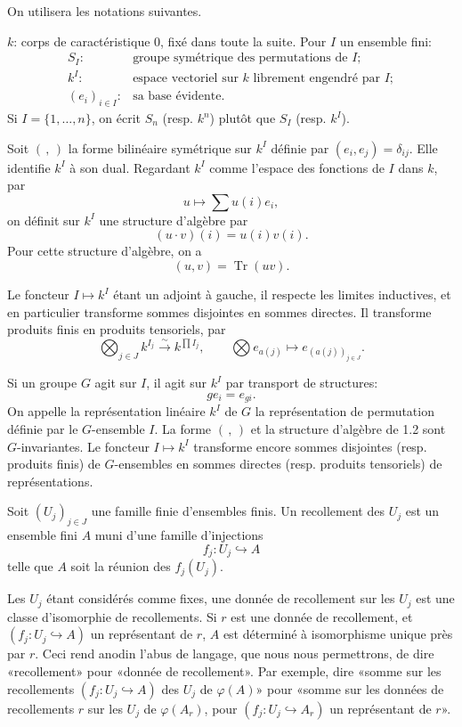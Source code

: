 \documentclass[11pt]{article}
\newcommand{\Tr}{\operatorname{Tr}}
\theoremstyle{deligne}
\newcommand{\para}[1]{\vspace{0.65em}\noindent{\bfseries #1}\quad}
\begin{document}
\para{1.1.}
On utilisera les notations suivantes.

\(k\): corps de caractéristique \(0\), fixé dans toute la suite. Pour \(I\) un ensemble fini:
\[
\begin{array}{rl}
S_I:&\text{groupe symétrique des permutations de }I;\\
k^I:&\text{espace vectoriel sur \(k\) librement engendré par }I;\\
(e_i)_{i\in I}:&\text{sa base évidente.}
\end{array}
\]
Si \(I=\{1,\ldots,n\}\), on écrit \(S_n\) (resp. \(k^n\)) plutôt que \(S_I\) (resp. \(k^I\)).

\para{1.2.}
Soit \((\, ,\, )\) la forme bilinéaire symétrique sur \(k^I\) définie par \((e_i,e_j)=\delta_{ij}\). Elle identifie \(k^I\) à son dual. Regardant \(k^I\) comme l'espace des fonctions de \(I\) dans \(k\), par
\[
  u\longmapsto \sum u(i)e_i,
\]
on définit sur \(k^I\) une structure d'algèbre par
\[
  (u\cdot v)(i)=u(i)v(i).
\]
Pour cette structure d'algèbre, on a
\[
  (u,v)=\Tr(uv).
\]

\para{1.3.}
Le foncteur \(I\mapsto k^I\) étant un adjoint à gauche, il respecte les limites inductives, et en particulier transforme sommes disjointes en sommes directes. Il transforme produits finis en produits tensoriels, par
\[
  \bigotimes_{j\in J} k^{I_j}\overset{\sim}{\longrightarrow}
  k^{\prod I_j},\qquad
  \bigotimes e_{a(j)}\longmapsto e_{(a(j))_{j\in J}}.
\]

\para{1.4.}
Si un groupe \(G\) agit sur \(I\), il agit sur \(k^I\) par transport de structures:
\[
  g e_i=e_{g i}.
\]
On appelle la représentation linéaire \(k^I\) de \(G\) la représentation de permutation définie par le \(G\)-ensemble \(I\). La forme \((\, ,\, )\) et la structure d'algèbre de 1.2 sont \(G\)-invariantes. Le foncteur \(I\mapsto k^I\) transforme encore sommes disjointes (resp. produits finis) de \(G\)-ensembles en sommes directes (resp. produits tensoriels) de représentations.

\para{1.5.}
Soit \((U_j)_{j\in J}\) une famille finie d'ensembles finis. Un recollement des \(U_j\) est un ensemble fini \(A\) muni d'une famille d'injections
\[
  f_j:U_j\hookrightarrow A
\]
telle que \(A\) soit la réunion des \(f_j(U_j)\).

Les \(U_j\) étant considérés comme fixes, une donnée de recollement sur les \(U_j\) est une classe d'isomorphie de recollements. Si \(r\) est une donnée de recollement, et \((f_j:U_j\hookrightarrow A)\) un représentant de \(r\), \(A\) est déterminé à isomorphisme unique près par \(r\). Ceci rend anodin l'abus de langage, que nous nous permettrons, de dire «recollement» pour «donnée de recollement». Par exemple, dire «somme sur les recollements \((f_j:U_j\hookrightarrow A)\) des \(U_j\) de \(\varphi(A)\)» pour «somme sur les données de recollements \(r\) sur les \(U_j\) de \(\varphi(A_r)\), pour \((f_j:U_j\hookrightarrow A_r)\) un représentant de \(r\)».
\end{document}
